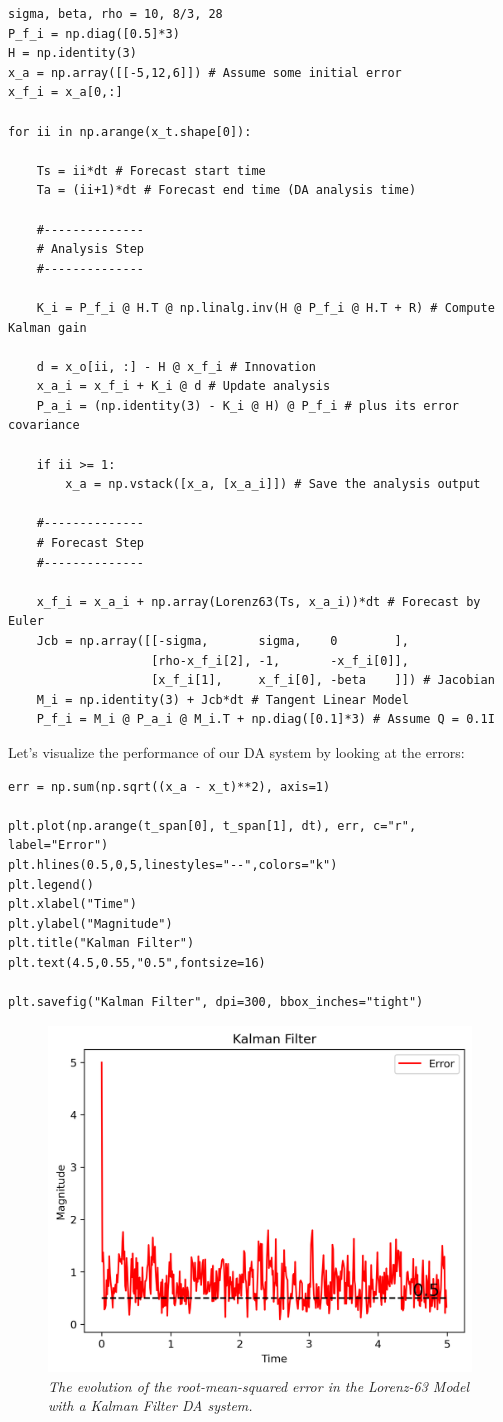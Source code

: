 \begin{lstlisting}
sigma, beta, rho = 10, 8/3, 28
P_f_i = np.diag([0.5]*3)
H = np.identity(3)
x_a = np.array([[-5,12,6]]) # Assume some initial error
x_f_i = x_a[0,:]

for ii in np.arange(x_t.shape[0]):

    Ts = ii*dt # Forecast start time
    Ta = (ii+1)*dt # Forecast end time (DA analysis time)

    #--------------
    # Analysis Step
    #--------------

    K_i = P_f_i @ H.T @ np.linalg.inv(H @ P_f_i @ H.T + R) # Compute Kalman gain

    d = x_o[ii, :] - H @ x_f_i # Innovation
    x_a_i = x_f_i + K_i @ d # Update analysis
    P_a_i = (np.identity(3) - K_i @ H) @ P_f_i # plus its error covariance
    
    if ii >= 1:
        x_a = np.vstack([x_a, [x_a_i]]) # Save the analysis output

    #--------------
    # Forecast Step
    #--------------
    
    x_f_i = x_a_i + np.array(Lorenz63(Ts, x_a_i))*dt # Forecast by Euler
    Jcb = np.array([[-sigma,       sigma,    0        ],
                    [rho-x_f_i[2], -1,       -x_f_i[0]],
                    [x_f_i[1],     x_f_i[0], -beta    ]]) # Jacobian
    M_i = np.identity(3) + Jcb*dt # Tangent Linear Model
    P_f_i = M_i @ P_a_i @ M_i.T + np.diag([0.1]*3) # Assume Q = 0.1I
\end{lstlisting}
Let's visualize the performance of our DA system by looking at the errors:
\begin{lstlisting}
err = np.sum(np.sqrt((x_a - x_t)**2), axis=1)

plt.plot(np.arange(t_span[0], t_span[1], dt), err, c="r", label="Error")
plt.hlines(0.5,0,5,linestyles="--",colors="k")
plt.legend()
plt.xlabel("Time")
plt.ylabel("Magnitude")
plt.title("Kalman Filter")
plt.text(4.5,0.55,"0.5",fontsize=16)

plt.savefig("Kalman Filter", dpi=300, bbox_inches="tight")
\end{lstlisting}
\begin{figure}[h!]
    \centering
    \includegraphics[width=0.75\linewidth]{graphics/Kalman3.png}
    \caption{\textit{The evolution of the root-mean-squared error in the Lorenz-63 Model with a Kalman Filter DA system.}}
    \label{fig:kalman3}
\end{figure}
